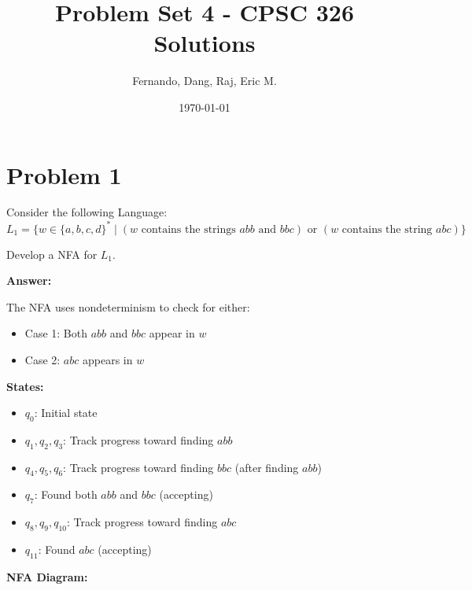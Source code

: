 \documentclass[12pt]{article}
\title{Problem Set 4 - CPSC 326\\Solutions}
\author{Fernando, Dang, Raj, Eric M.}
\date{\today}
\begin{document}
\maketitle

\section*{Problem 1}
Consider the following Language:
$$L_1 = \{w \in \{a, b, c, d\}^* \mid (w \text{ contains the strings } abb \text{ and } bbc) \text{ or } (w \text{ contains the string } abc)\}$$

Develop a NFA for $L_1$.

\textbf{Answer:}

The NFA uses nondeterminism to check for either:
\begin{itemize}
    \item Case 1: Both $abb$ and $bbc$ appear in $w$
    \item Case 2: $abc$ appears in $w$
\end{itemize}

\textbf{States:}
\begin{itemize}
    \item $q_0$: Initial state
    \item $q_1, q_2, q_3$: Track progress toward finding $abb$
    \item $q_4, q_5, q_6$: Track progress toward finding $bbc$ (after finding $abb$)
    \item $q_7$: Found both $abb$ and $bbc$ (accepting)
    \item $q_8, q_9, q_{10}$: Track progress toward finding $abc$
    \item $q_{11}$: Found $abc$ (accepting)
\end{itemize}

\textbf{NFA Diagram:}
\end{document}
